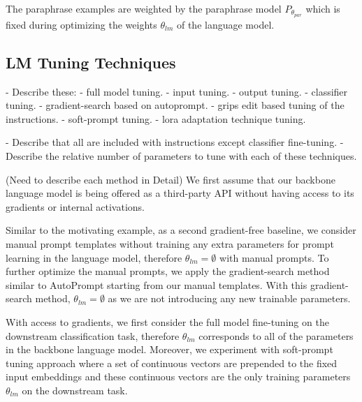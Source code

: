 \documentclass[11pt]{article}
\begin{document}
The paraphrase examples are weighted by the paraphrase model $P_{\theta_{par}}$ which is fixed during optimizing the weights $\theta_{lm}$ of the language model.

\subsection{LM Tuning Techniques}
- Describe these:
    - full model tuning.
    - input tuning.
    - output tuning.
    - classifier tuning.
    - gradient-search based on autoprompt.
    - grips edit based tuning of the instructions.
    - soft-prompt tuning.
    - lora adaptation technique tuning.

- Describe that all are included with instructions except classifier fine-tuning.
- Describe the relative number of parameters to tune with each of these techniques.

(Need to describe each method in Detail)
We first assume that our backbone language model is being offered as a third-party API without having access to its gradients or internal activations.





Similar to the motivating example, as a second gradient-free baseline, we consider manual prompt templates without training any extra parameters for prompt learning in the language model, therefore $\theta_{lm} = \emptyset$ with manual prompts. To further optimize the manual prompts, we apply the gradient-search method similar to AutoPrompt \cite{shin-etal-2020-autoprompt} starting from our manual templates. With this gradient-search method, $\theta_{lm} = \emptyset$ as we are not introducing any new trainable parameters.

With access to gradients, we first consider the full model fine-tuning on the downstream classification task, therefore $\theta_{lm}$ corresponds to all of the parameters in the backbone language model. Moreover, we experiment with soft-prompt tuning approach \cite{lester-etal-2021-power} where a set of continuous vectors are prepended to the fixed input embeddings and these continuous vectors are the only training parameters $\theta_{lm}$ on the downstream task.
\end{document}
